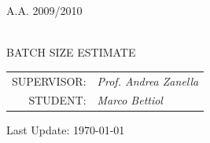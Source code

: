 \begin{titlepage}
		\vskip1.2cm\begin{center}
      \rm\large\uppercase\expandafter{A.A. 2009/2010\\}
 \end{center}
    	
    \vskip 2.5cm\begin{center}
    \HRule \\[0.4cm]\LARGE\expandafter{BATCH SIZE ESTIMATE}
    \HRule \\[0.4cm]
    \end{center}
    
    \begin{flushright}\vskip4.0cm 
    \begin{tabular}{rl}
            \rm\large \uppercase{Supervisor:} &\emph{Prof. Andrea Zanella}\\
	   \rm\large \uppercase{Student:} &\emph{Marco Bettiol} \\
		\end{tabular}
     \end{flushright}
    \vfill
          \begin{center}
                  \vskip1.0cm 
                  Last Update: \today  \hspace{1mm } \currenttime
           \end{center}
    
\end{titlepage}


\newpage

